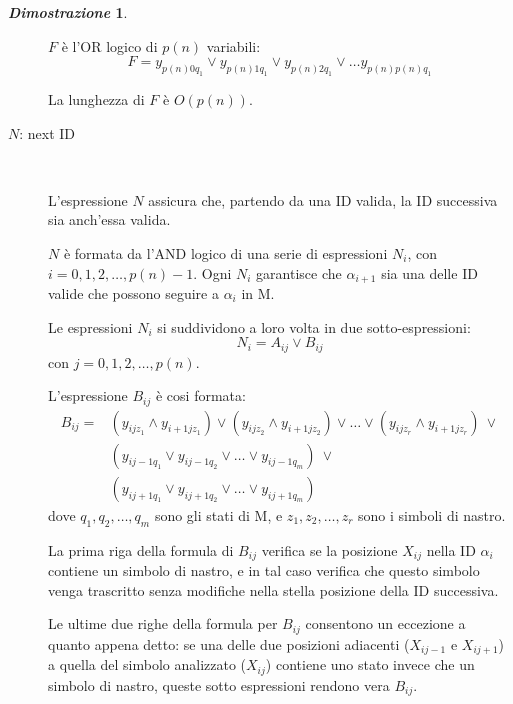 \documentclass[12pt]{article}
\theoremstyle{definition}
\newtheorem*{myproof}{\em Dimostrazione}
\begin{document}
\begin{myproof}
\begin{description}
    \(F\) \`e l'OR logico di \(p(n)\) variabili:\[
    F = y_{p(n)0q_1} \lor y_{p(n)1q_1} \lor y_{p(n)2q_1} \lor \ldots y_{p(n)p(n)q_1}
    \]

    La lunghezza di \(F\) \`e \(O(p(n))\).
    \newline

  \item[\(N\): next ID]\ \newline

    L'espressione \(N\) assicura che, partendo da una ID valida, la ID successiva sia anch'essa valida.
    \newline
    
    \(N\) \`e formata da l'AND logico di una serie di espressioni \(N_i\), con \(i = 0,1,2,\ldots,p(n)-1\).
    Ogni \(N_i\) garantisce che \(\alpha_{i+1}\) sia una delle ID valide che possono seguire a \(\alpha_i\) in M.
    \newline

    Le espressioni \(N_i\) si suddividono a loro volta in due sotto-espressioni:\[
    N_i = A_{ij} \lor B_{ij}
    \] con \(j = 0,1,2,\ldots,p(n)\). \newline

    L'espressione \(B_{ij}\) \`e cosi formata: \[
    \begin{aligned}
    B_{ij} = &(y_{ijz_1} \land y_{i+1jz_1}) \lor (y_{ijz_2} \land y_{i+1jz_2}) \lor \ldots \lor (y_{ijz_r} \land y_{i+1jz_r})\ \lor \\
    &(y_{ij-1q_1} \lor y_{ij-1q_2} \lor \ldots \lor y_{ij-1q_m})\ \lor \\
    &(y_{ij+1q_1} \lor y_{ij+1q_2} \lor \ldots \lor y_{ij+1q_m})
    \end{aligned}
    \] dove \(q_1,q_2,\ldots,q_m\) sono gli stati di M, e \(z_1,z_2,\ldots,z_r\) sono i simboli di nastro.\newline

    La prima riga della formula di \(B_{ij}\) verifica se la posizione \(X_{ij}\) nella ID \(\alpha_i\)
    contiene un simbolo di nastro, e in tal caso verifica che questo simbolo venga trascritto
    senza modifiche nella stella posizione della ID successiva. \newline

    Le ultime due righe della formula per \(B_{ij}\) consentono un eccezione a quanto appena detto:
    se una delle due posizioni adiacenti (\(X_{ij-1}\) e \(X_{ij+1}\)) a quella del simbolo analizzato (\(X_{ij}\))
    contiene uno stato invece che un simbolo di nastro, queste sotto espressioni rendono vera \(B_{ij}\). \newline


\end{description}
\end{myproof}
\end{document}
